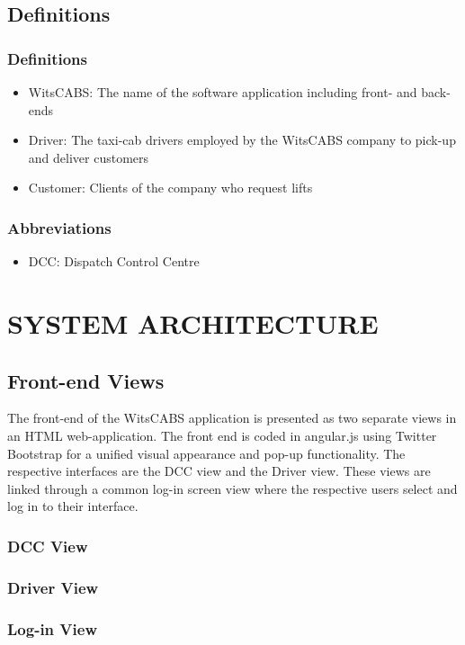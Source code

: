 \documentclass[10pt, onecolumn]{witseiepaper}
\begin{document}
\subsection{Definitions}
\subsubsection{Definitions}
\begin{itemize}
\item WitsCABS: The name of the software application including front- and back-ends
\item Driver: The taxi-cab drivers employed by the WitsCABS company to pick-up and deliver customers
\item Customer: Clients of the company who request lifts
\end{itemize}
\subsubsection{Abbreviations}
\begin{itemize}
\item DCC: Dispatch Control Centre
\end{itemize}


\section{SYSTEM ARCHITECTURE}
\subsection{Front-end Views}
The front-end of the WitsCABS application is presented as two separate views in an HTML web-application. The front end is coded in angular.js using Twitter Bootstrap for a unified visual appearance and pop-up functionality. The respective interfaces are the DCC view and the Driver view. These views are linked through a common log-in screen view where the respective users select and log in to their interface.
\subsubsection{DCC View}

\subsubsection{Driver View}
\subsubsection{Log-in View}
\end{document}
